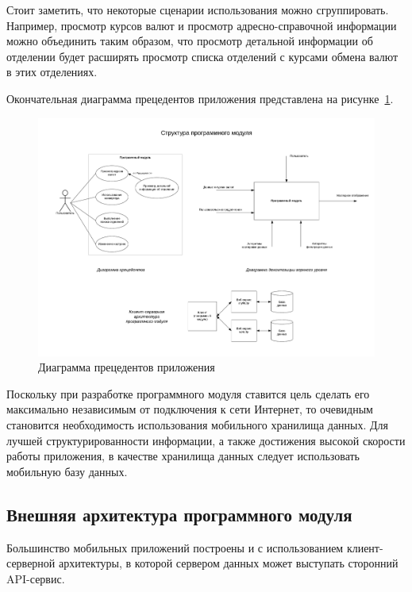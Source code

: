 Стоит заметить, что некоторые сценарии использования можно сгруппировать.
Например, просмотр курсов валют и просмотр адресно-справочной информации можно
объединить таким образом, что просмотр детальной информации об отделении будет
расширять просмотр списка отделений с курсами обмена валют в этих отделениях.

Окончательная диаграмма прецедентов приложения
представлена на рисунке~\ref{fig:use_case}.
\begin{figure}[h!]
  \centering
  \includegraphics[width=160mm]{fig/use_case}
  \caption{Диаграмма прецедентов приложения}
  \label{fig:use_case}
\end{figure}

Поскольку при разработке программного модуля ставится цель сделать его
максимально независимым от подключения к сети Интернет, то очевидным становится
необходимость использования мобильного хранилища данных. Для лучшей
структурированности информации, а также достижения высокой скорости работы приложения,
в качестве хранилища данных следует использовать мобильную базу данных.

\pagebreak



\subsection{Внешняя архитектура программного модуля}

Большинство мобильных приложений построены и с использованием клиент-серверной
архитектуры, в которой сервером данных может выступать сторонний API-сервис.

